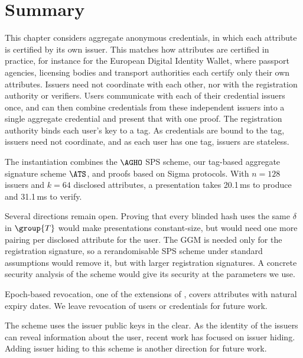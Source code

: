 \section{Summary}\label{sec:agg-creds-summary}

This chapter considers aggregate anonymous credentials, in which each attribute
is certified by its own issuer. This matches how attributes are certified in
practice, for instance for the European Digital Identity Wallet, where passport
agencies, licensing bodies and transport authorities each certify only their
own attributes.  Issuers need not coordinate
with each other, nor with the registration authority or verifiers. Users
communicate with each of their credential issuers once, and can then combine
credentials from these independent issuers into a single aggregate credential
and present that with one proof.  The registration authority binds each user's
key to a tag. As credentials are bound to the tag, issuers need not
coordinate, and as each user has one tag, issuers are stateless.

The instantiation combines the $\AGHO$ SPS scheme, our tag-based aggregate
signature scheme $\ATS$, and proofs based on Sigma protocols. With $n = 128$
issuers and $k = 64$ disclosed attributes, a presentation takes 20.1\,ms to
produce and 31.1\,ms to verify.

Several directions remain open. Proving that every blinded hash uses the same
$\delta$ in $\group{T}$ would make presentations constant-size, but would need
one more pairing per disclosed attribute for the user. The GGM is needed only for
the registration signature, so a rerandomisable SPS scheme under standard
assumptions would remove it, but with larger registration signatures. A
concrete security analysis of the scheme would give its security at the parameters
we use.

Epoch-based revocation, one of the extensions of
, covers attributes with natural expiry dates.
We leave revocation of users or credentials for future work.

The scheme uses the issuer public keys in the clear. As the identity of the
issuers can reveal information about the user, recent work has focused on
issuer hiding. Adding issuer hiding to this scheme is another direction for
future work.
